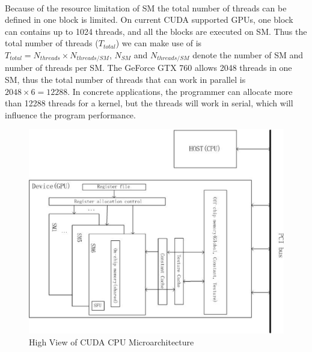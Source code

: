\documentclass[12pt,a4paper,final]{article}
\begin{document}
\begin{spacing}{2.5}
\paragraph{}Because of the resource limitation of SM the total number of threads can be defined in one block is limited. On current CUDA supported GPUs, one block can contains up to 1024 threads, and all the blocks are executed on SM. Thus the total number of threads ($T_{total}$) we can make use of is $T_{total}=N_{threads}\times N_{threads/SM} $, $N_{SM}$ and $N_{threads/SM}$ denote the number of SM and number of threads per SM. The GeForce GTX 760 allows 2048 threads in one SM, thus the total number of threads that can work in parallel is $2048\times 6=12288$. In concrete applications, the programmer can allocate more than 12288 threads for a kernel, but the threads will work in serial, which will influence the program performance. 
\begin{figure}[htb]
\centering
\includegraphics[scale=0.5]{High_view_of_CUDA_GPU_microarchitecture.eps}
\caption{High View of CUDA CPU Microarchitecture}
\label{figure2}
\end{figure}   

\end{spacing}
\end{document}
